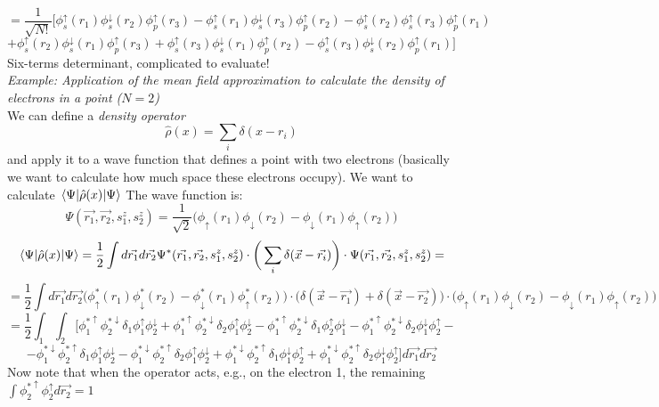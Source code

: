 \[
=\frac{1}{\sqrt{N!}}\big[
\phi_s^\uparrow(r_1)\phi_s^\downarrow(r_2)\phi_p^\uparrow(r_3)
-\phi_s^\uparrow(r_1)\phi_s^\downarrow(r_3)\phi_p^\uparrow(r_2)
-\phi_s^\uparrow(r_2)\phi_s^\uparrow(r_3)\phi_p^\uparrow(r_1)\]
\[+\phi_s^\uparrow(r_2)\phi_s^\downarrow(r_1)\phi_p^\uparrow(r_3)
+\phi_s^\uparrow(r_3)\phi_s^\downarrow(r_1)\phi_p^\uparrow(r_2)
-\phi_s^\uparrow(r_3)\phi_s^\downarrow(r_2)\phi_p^\uparrow(r_1)
\big]
\]
Six-terms determinant, complicated to evaluate!\\
\newline
\textit{Example: Application of the mean field approximation to calculate the density of electrons in a point ($N=2$)}\\
\newline
We can define a \textit{density operator}
\[
\hat{\rho}(x)=\sum_i\delta(x-r_i)
\]
and apply it to a wave function that defines a point with two electrons (basically we want to calculate how much space these electrons occupy). We want to calculate $\mel{\Psi}{\hat{\rho}(x)}{\Psi}$
The wave function is:
\[
\Psi(\vec{r_1},\vec{r_2},s_1^z,s_2^z)=\frac{1}{\sqrt{2}}\big(\phi_\uparrow(r_1)\phi_\downarrow(r_2)-\phi_\downarrow(r_1)\phi_\uparrow(r_2)\big)
\]
\[
\mel{\Psi}{\hat{\rho}(x)}{\Psi}=\frac{1}{2}\int d\vec{r_1}d\vec{r_2} \Psi^*(\vec{r_1},\vec{r_2},s_1^z,s_2^z)\cdot\bigg(\sum_i \delta(\vec{x}-\vec{r_i})\bigg)\cdot\Psi(\vec{r_1},\vec{r_2},s_1^z,s_2^z)=
\]
\[
=\frac{1}{2}\int d\vec{r_1}d\vec{r_2}\big(\phi^*_\uparrow(r_1)\phi^*_\downarrow(r_2)-\phi^*_\downarrow(r_1)\phi^*_\uparrow(r_2)\big)\cdot\big(\delta(\vec{x}-\vec{r_1})+\delta(\vec{x}-\vec{r_2})\big)\cdot\big(\phi_\uparrow(r_1)\phi_\downarrow(r_2)-\phi_\downarrow(r_1)\phi_\uparrow(r_2)\big)
\]
\[
=\frac{1}{2}\int_1\int_2\bigg[
\phi_1^{*\uparrow}\phi_2^{*\downarrow}\delta_1\phi_1^\uparrow\phi_2^\downarrow
+\phi_1^{*\uparrow}\phi_2^{*\downarrow}\delta_2\phi_1^\uparrow\phi_2^\downarrow
-\phi_1^{*\uparrow}\phi_2^{*\downarrow}\delta_1\phi_2^\uparrow\phi_1^\downarrow
-\phi_1^{*\uparrow}\phi_2^{*\downarrow}\delta_2\phi_1^\downarrow\phi_2^\uparrow -\]
\[
-\phi_1^{*\downarrow}\phi_2^{*\uparrow}\delta_1\phi_1^\uparrow\phi_2^\downarrow
-\phi_1^{*\downarrow}\phi_2^{*\uparrow}\delta_2\phi_1^\uparrow\phi_2^\downarrow
+\phi_1^{*\downarrow}\phi_2^{*\uparrow}\delta_1\phi_1^\downarrow\phi_2^\uparrow
+\phi_1^{*\downarrow}\phi_2^{*\uparrow}\delta_2\phi_1^\downarrow\phi_2^\uparrow
\bigg]d\vec{r_1}d\vec{r_2}
\]
Now note that when the operator acts, e.g., on the electron 1, the remaining $\int \phi_2^{*\uparrow}\phi_2^\uparrow d\vec{r_2}=1$
